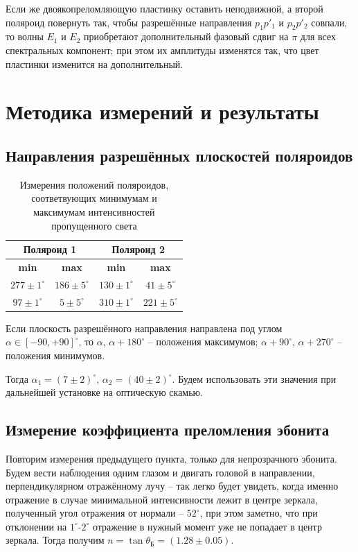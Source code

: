 \documentclass[12pt, a4paper]{article}
\begin{document}
Если же двоякопреломляющую пластинку оставить неподвижной, а второй поляроид
повернуть так, чтобы разрешённые направления $ p_1p'_1 $ и $ p_2p'_2 $ совпали,
то волны $ E_1 $ и $ E_2 $ приобретают дополнительный фазовый сдвиг на $ \pi $
для всех спектральных компонент; при этом их амплитуды изменятся так, что цвет
пластинки изменится на дополнительный.

\section{Методика измерений и результаты}
\subsection{Направления разрешённых плоскостей поляроидов}

\begin{table}[h]
    \centering
    \begin{tabular}{|c|c|c|c|}
        \hline
        \multicolumn{2}{|c|}{\textbf{Поляроид 1}} & \multicolumn{2}{|c|}{\textbf{Поляроид 2}}                                         \\
        \hline
        \textbf{min}                              & \textbf{max}                              & \textbf{min}      & \textbf{max}      \\
        \hline
        $277 \pm 1^\circ$                         & $186 \pm 5^\circ$                         & $130 \pm 1^\circ$ & $41 \pm 5^\circ$  \\
        \hline
        $97 \pm 1^\circ$                          & $5 \pm 5^\circ$                           & $310 \pm 1^\circ$ & $221 \pm 5^\circ$ \\
        \hline
    \end{tabular}
    \caption{Измерения положений поляроидов, соответвующих минимумам и максимумам интенсивностей пропущенного света}
\end{table}

Если плоскость разрешённого направления направлена под углом $\alpha \in
    [-90,+90]^\circ$, то $\alpha$, $\alpha+180^\circ$ -- положения максимумов;
$\alpha+90^\circ$, $\alpha+270^\circ$ -- положения минимумов.

Тогда $\alpha_1 = (7\pm2)^\circ$, $\alpha_2 = (40\pm2)^\circ$. Будем
использовать эти значения при дальнейшей установке на оптическую скамью.

\subsection{Измерение коэффициента преломления эбонита}
Повторим измерения предыдущего пункта, только для непрозрачного эбонита. Будем
вести наблюдения одним глазом и двигать головой в направлении, перпендикулярном
отражённому лучу -- так легко будет увидеть, когда именно отражение в случае
минимальной интенсивности лежит в центре зеркала, полученный угол отражения от
нормали -- $52^\circ$, при этом заметно, что при отклонении на
$1^\circ$-$2^\circ$ отражение в нужный момент уже не попадает в центр зеркала.
Тогда получим $n = \tan \theta_\text{Б} = (1.28\pm0.05)$.
\end{document}

